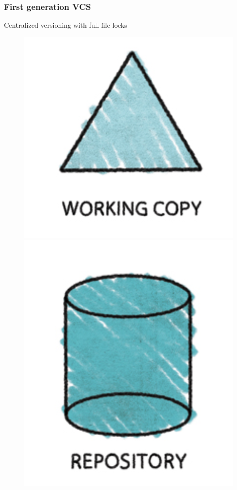 \documentclass{beamer}
\begin{document}
\begin{frame}
\frametitle{First generation VCS}
Centralized versioning with full file locks

\begin{figure}

\includegraphics[scale=0.3]{figures/f4.png}
\includegraphics[scale=0.3]{figures/f3.png}
\end{figure}

\end{frame}
\end{document}
